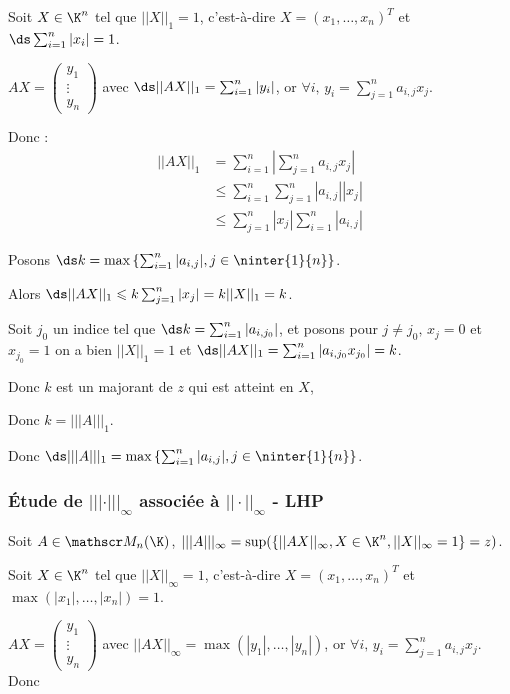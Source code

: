Soit $X \in \K^n$ tel que $||X||_1 = 1$, c'est-à-dire $X = (x_1, \ldots, x_n)^T$ et $\ds \sum_{i=1}^n |x_i| = 1$.

$AX = \begin{pmatrix}
    y_1 \\
    \vdots \\
    y_n
\end{pmatrix}$  avec $\ds ||AX||_1 = \sum_{i=1}^n |y_i|$, 
or $\displaystyle \forall i, \, y_i = \sum_{j=1}^n a_{i, j} x_j$. 

Donc :
\begin{align*}
    || AX ||_1 & = \sum_{i=1}^n \left| \sum_{j=1}^n a_{i, j} x_j \right| \\
    & \leqslant \sum_{i=1}^n \sum_{j=1}^n |a_{i, j}| |x_j| \\
    & \leqslant \sum_{j=1}^n |x_j| \sum_{i=1}^n |a_{i, j}| 
\end{align*}

Posons $\ds k = \max \left\{ \sum_{i=1}^n |a_{i, j}|, j \in \ninter{1}{n} \right\}$.

Alors $\ds ||AX||_1 \leqslant k \sum_{j=1}^n |x_j| = k ||X||_1 = k$.


Soit $j_0$ un indice tel que $\ds k = \sum_{i=1}^n |a_{i, j_0}|$, et posons pour 
$j \neq j_0, \, x_j = 0$ et $x_{j_0} = 1$ on a bien $||X||_1 = 1$ et
$\ds ||AX||_1 = \sum_{i=1}^n |a_{i, j_0} x_{j_0}| = k$.

Donc $k$ est un majorant de $z$ qui est atteint en $X$,

Donc $k = |||A|||_1$.

Donc $\ds |||A|||_1 = \max \left\{ \sum_{i=1}^n |a_{i, j}|, j \in \ninter{1}{n} \right\}$.

\subsubsection{Étude de $||| \cdot |||_\infty$ associée à $|| \cdot ||_\infty$ - LHP}
Soit $A \in \mathscr M_n(\K)$, $|||A|||_\infty = \sup (\{ ||AX||_\infty, X \in \K^n, ||X||_\infty = 1 \} = z) $.

Soit $X \in \K^n$ tel que $||X||_\infty = 1$, c'est-à-dire $X = (x_1, \ldots, x_n)^T$ et $\max(|x_1|, \ldots, |x_n|) = 1$.

$AX = \begin{pmatrix}
    y_1 \\
    \vdots \\
    y_n
\end{pmatrix}$  avec $||AX||_\infty = \max(|y_1|, \ldots, |y_n|)$, 
or $\displaystyle \forall i, \, y_i = \sum_{j=1}^n a_{i, j} x_j$. Donc 

